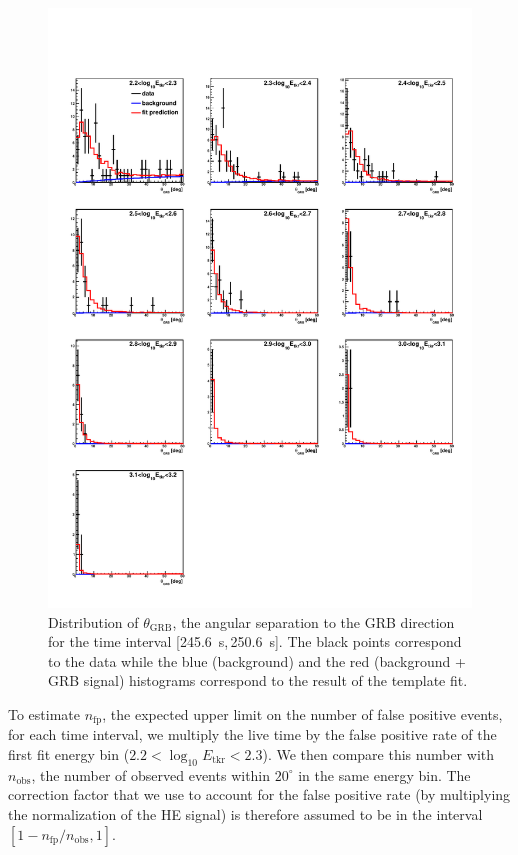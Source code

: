 \documentclass[preprint]{aastex631}
\begin{document}
\begin{figure}[t]
    \centering
    \includegraphics[width=0.9\linewidth]{paper_showfit2dindex.pdf}
    \caption{Distribution of $\theta_\mathrm{GRB}$, the angular separation to the GRB direction for the time interval [245.6~s,\,250.6~s]. The black points correspond to the data while the blue (background) and the red (background + GRB signal) histograms correspond to the result of the template fit.}
    \label{fig:TemplateFit}
\end{figure}

To estimate $n_\mathrm{fp}$, the expected upper limit on the number of false positive events, for each time interval, we multiply the live time by the false positive rate of the first fit energy bin ($2.2<\log_{10}E_\mathrm{tkr}<2.3$). We then compare this number with $n_\mathrm{obs}$, the number of observed events within $20^\circ$ in the same energy bin. The correction factor that we use to account for the false positive rate (by multiplying the normalization of the HE signal) is therefore assumed to be in the interval $[1-n_\mathrm{fp}/n_\mathrm{obs},1]$.
\end{document}

